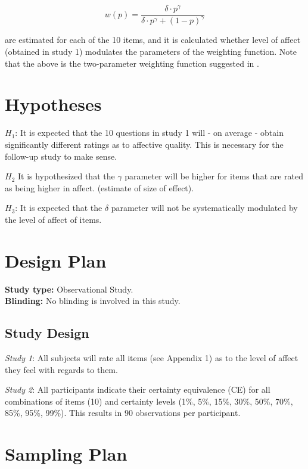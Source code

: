 \documentclass[12pt]{article}
\begin{document}
\[
	w(p) = \frac{\delta \cdot p^{\gamma}}
	{\delta \cdot p^{\gamma} + (1-p)^{\gamma}}
\]

are estimated for each of the 10 items, and it
is calculated whether level of affect (obtained in
study 1) modulates the parameters of the weighting
function. Note that the above is the two-parameter
weighting function
suggested in \autocite{gonzalez1999shape}.

\section{Hypotheses}

$H_1$: It is expected that the 10 questions in
study 1 will - on average - obtain significantly
different ratings as to affective quality.
This is necessary for the follow-up study to
make sense.

$H_2$ It is hypothesized that the $\gamma$
parameter will be higher for items that are
rated as being higher in affect.
(estimate of size of effect).

$H_3$: It is expected that the $\delta$
parameter will not be systematically
modulated by the level of affect of items.

\section{Design Plan}

\textbf{Study type:} Observational Study. \\

\textbf{Blinding:} No blinding is involved in this study. \\

\subsection{Study Design}

\emph{Study 1}: All subjects will rate all items
(see Appendix 1) as to the level of affect they
feel with regards to them.

\emph{Study 2}: All participants
indicate their certainty equivalence (CE) for all
combinations of items (10) and certainty levels
(1\%, 5\%, 15\%, 30\%, 50\%, 70\%, 85\%, 95\%, 99\%).
This results in $90$ observations per participant.

\section{Sampling Plan}
\end{document}
